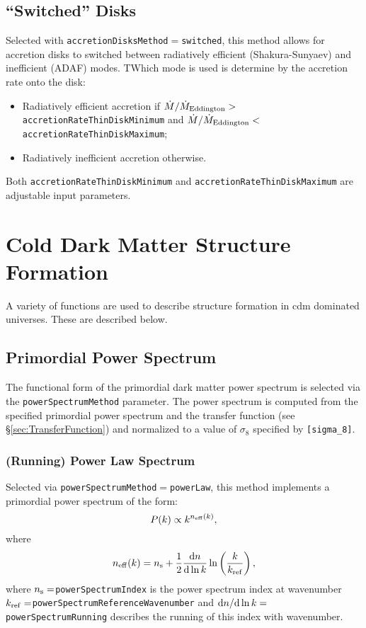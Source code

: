 \subsection{``Switched'' Disks}

Selected with {\tt accretionDisksMethod}$=${\tt switched}, this method allows for accretion disks to switched between radiatively efficient (Shakura-Sunyaev) and inefficient (ADAF) modes. TWhich mode is used is determine by the accretion rate onto the disk:
\begin{itemize}
 \item Radiatively efficient accretion if $\dot{M}/\dot{M}_{\rm Eddington}>${\tt accretionRateThinDiskMinimum} and $\dot{M}/\dot{M}_{\rm Eddington}<${\tt accretionRateThinDiskMaximum};
 \item Radiatively inefficient accretion otherwise.
\end{itemize}
Both {\tt accretionRateThinDiskMinimum} and {\tt accretionRateThinDiskMaximum} are adjustable input parameters.

\section{Cold Dark Matter Structure Formation}

A variety of functions are used to describe structure formation in \gls{cdm} dominated universes. These are described below.

\subsection{Primordial Power Spectrum}\label{sec:PrimordialPowerSpectrum}

The functional form of the primordial dark matter power spectrum is selected via the {\tt powerSpectrumMethod} parameter. The power spectrum is computed from the specified primordial power spectrum and the transfer function (see \S\ref{sec:TransferFunction}) and normalized to a value of $\sigma_8$ specified by {\tt [sigma\_8]}.

\subsubsection{(Running) Power Law Spectrum}

Selected via {\tt powerSpectrumMethod}$=${\tt powerLaw}, this method implements a primordial power spectrum of the form:
\begin{equation}
 P(k) \propto k^{n_{\rm eff}(k)},
\end{equation}
where
\begin{equation}
 n_{\rm eff}(k) = n_{\rm s} + {1\over 2}{\d n \over \d \ln k} \ln \left( {k \over k_{\rm ref}} \right),
\end{equation}
where $n_{\rm s}=${\tt powerSpectrumIndex} is the power spectrum index at wavenumber $k_{\rm ref}=${\tt powerSpectrumReferenceWavenumber} and $\d n / \d \ln k=${\tt powerSpectrumRunning} describes the running of this index with wavenumber.

